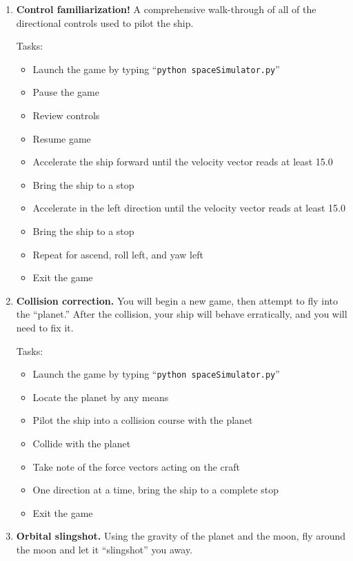 \begin{enumerate}

  \item \textbf{Control familiarization!}  A comprehensive walk-through of all of the directional controls used to pilot the ship. 

  Tasks:
  \begin{itemize}
    \item Launch the game by typing ``\texttt{python spaceSimulator.py}''
    \item Pause the game
    \item Review controls
    \item Resume game
    \item Accelerate the ship forward until the velocity vector reads at least 15.0
    \item Bring the ship to a stop
    \item Accelerate in the left direction until the velocity vector reads at least 15.0
    \item Bring the ship to a stop
    \item Repeat for ascend, roll left, and yaw left
    \item Exit the game
  \end{itemize}
  
  \item \textbf{Collision correction.}  You will begin a new game, then attempt to fly into the ``planet.''  After the collision, your ship will behave erratically, and you will need to fix it.
  
  Tasks:
  \begin{itemize}
    \item Launch the game by typing ``\texttt{python spaceSimulator.py}''
    \item Locate the planet by any means
    \item Pilot the ship into a collision course with the planet
    \item Collide with the planet
    \item Take note of the force vectors acting on the craft
    \item One direction at a time, bring the ship to a complete stop
    \item Exit the game
  \end{itemize}
  
  \item \textbf{Orbital slingshot.}  Using the gravity of the planet and the moon, fly around the moon and let it ``slingshot'' you away.
  

\end{enumerate}
